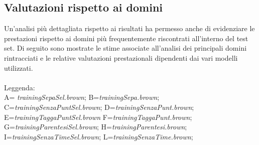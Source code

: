 \documentclass[a4paper]{report}
\begin{document}
\subsection{Valutazioni rispetto ai domini}
Un'analisi più dettagliata rispetto ai risultati ha permesso anche di evidenziare le prestazioni rispetto ai domini più frequentemente riscontrati all'interno del test set. Di seguito sono mostrate le stime associate all'analisi dei principali domini rintracciati e le relative valutazioni prestazionali dipendenti dai vari modelli utilizzati. \\ \\
Leggenda:\\ A= \textit{trainingSepaSel.brown}; B=\textit{trainingSepa.brown}; \\C=\textit{trainingSenzaPuntSel.brown}; D=\textit{trainingSenzaPunt.brown}; \\E=\textit{trainingTaggaPuntSel.brown} F=\textit{trainingTaggaPunt.brown};\\ G=\textit{trainingParentesiSel.brown};  H=\textit{trainingParentesi.brown};\\ I=\textit{trainingSenzaTimeSel.brown}; L=\textit{trainingSenzaTime.brown}; \\
\end{document}
